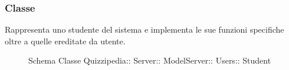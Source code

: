 \subsubsection{Classe }
Rappresenta uno studente del sistema e implementa le sue funzioni specifiche oltre a quelle ereditate da utente.
\begin{figure}[H]
\centering
\noindent{}
\caption[Schema Classe Student]{Schema Classe Quizzipedia:: Server:: ModelServer:: Users:: Student}
\end{figure}
